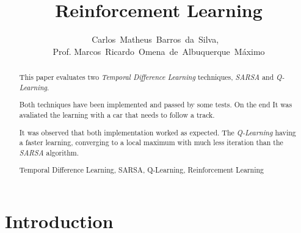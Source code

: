 \documentclass[journal]{IEEEtran}
\begin{document}
    \title{Reinforcement Learning}
  \author{Carlos~Matheus~Barros~da~Silva,
  ~
  \\Prof. Marcos~Ricardo~Omena~de~Albuquerque~Máximo}


\maketitle


\begin{abstract}

This paper evaluates two \textit{Temporal Difference Learning} techniques, \textit{SARSA} and \textit{Q-Learning}.

Both techniques have been implemented and passed by some tests. On the end It was avaliated the learning with a car that needs to follow a track.

It was observed that both implementation worked as expected. The \textit{Q-Learning} having a faster learning, converging to a local maximum with much less iteration than the \textit{SARSA} algorithm.

\begin{IEEEkeywords}
    Temporal Difference Learning, SARSA, Q-Learning, Reinforcement Learning
\end{IEEEkeywords}
\end{abstract}

\IEEEpeerreviewmaketitle



\section{Introduction}
\end{document}
